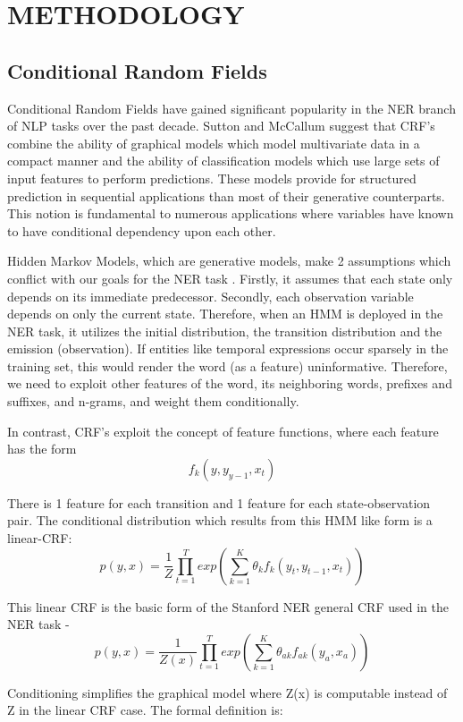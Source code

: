 \documentclass[letterpaper, 10 pt, conference]{ieeeconf}
\begin{document}
\section{METHODOLOGY}

\subsection{Conditional Random Fields}

Conditional Random Fields have gained significant popularity in the NER branch of NLP tasks over the past decade. Sutton and McCallum\cite{c6} suggest that CRF's combine the ability of graphical models which model multivariate data in a compact manner and the ability of classification models which use large sets of input features to perform predictions. These models provide for structured prediction in sequential applications than most of their generative counterparts. This notion is fundamental to numerous applications where variables have known to have conditional dependency upon each other.

Hidden Markov Models, which are generative models, make 2 assumptions which conflict with our goals for the NER task \cite{c6}. Firstly, it assumes that each state only depends on its immediate predecessor. Secondly, each observation variable depends on only the current state. Therefore, when an HMM is deployed in the NER task, it utilizes the initial distribution, the transition distribution and the emission (observation)\cite{c6}. If entities like temporal expressions occur sparsely in the training set, this would render the word (as a feature) uninformative. Therefore, we need to exploit other features of the word, its neighboring words, prefixes and suffixes, and n-grams, and weight them conditionally.

In contrast, CRF's exploit the concept of feature functions, where each feature has the form $$f_{k}(y, y_{y-1}, x_t) $$ 

There is 1 feature for each transition and 1 feature for each state-observation pair. The conditional distribution which results from this HMM like form is a linear-CRF:
$$
p(y, x) = \frac{1}{Z}\prod_{t=1}^Texp(\sum_{k=1}^{K}\theta_kf_k(y_t, y_{t-1}, x_t))
$$

This linear CRF is the basic form of the Stanford NER general CRF used in the NER task - 
$$
p(y, x) = \frac{1}{Z(x)}\prod_{t=1}^Texp(\sum_{k=1}^{K}\theta_{ak}f_{ak}(y_a, x_a))
$$

Conditioning simplifies the graphical model where Z(x) is computable instead of Z in the linear CRF case. The formal definition is: \\
\end{document}

